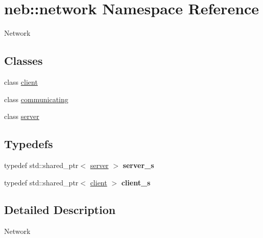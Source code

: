 \hypertarget{namespaceneb_1_1network}{
\section{neb::network Namespace Reference}
\label{namespaceneb_1_1network}
}


Network  
\subsection*{Classes}
\begin{DoxyCompactItemize}
\item 
class \hyperlink{classneb_1_1network_1_1client}{client}
\item 
class \hyperlink{classneb_1_1network_1_1communicating}{communicating}
\item 
class \hyperlink{classneb_1_1network_1_1server}{server}
\end{DoxyCompactItemize}
\subsection*{Typedefs}
\begin{DoxyCompactItemize}
\item 
\hypertarget{namespaceneb_1_1network_a452af21e9d59ab10e8c3b59eacd393df}{
typedef std::shared\_\-ptr$<$ \hyperlink{classneb_1_1network_1_1server}{server} $>$ {\bfseries server\_\-s}}
\label{namespaceneb_1_1network_a452af21e9d59ab10e8c3b59eacd393df}

\item 
\hypertarget{namespaceneb_1_1network_a91addb096a9291cf61369807bd3d3b34}{
typedef std::shared\_\-ptr$<$ \hyperlink{classneb_1_1network_1_1client}{client} $>$ {\bfseries client\_\-s}}
\label{namespaceneb_1_1network_a91addb096a9291cf61369807bd3d3b34}

\end{DoxyCompactItemize}


\subsection{Detailed Description}
Network 